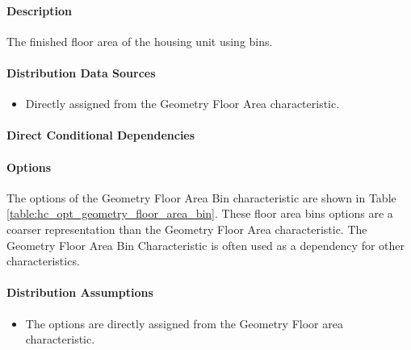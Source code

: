 \paragraph{Description}
% 
The finished floor area of the housing unit using bins.

\paragraph{Distribution Data Sources}
% 
\begin{itemize}
    \item Directly assigned from the Geometry Floor Area characteristic.
\end{itemize}

\paragraph{Direct Conditional Dependencies}


\paragraph{Options}
The options of the Geometry Floor Area Bin characteristic are shown in Table \ref{table:hc_opt_geometry_floor_area_bin}. These floor area bins options are a coarser representation than the Geometry Floor Area characteristic. The Geometry Floor Area Bin Characteristic is often used as a dependency for other characteristics.



\paragraph{Distribution Assumptions}
% 
\begin{itemize}
    \item The options are directly assigned from the Geometry Floor area characteristic.
\end{itemize}

